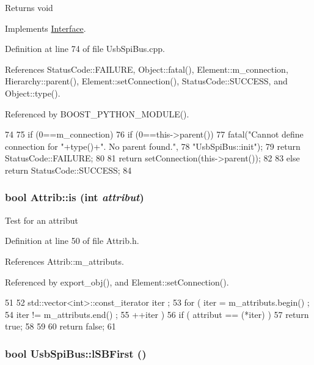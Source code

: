 \begin{DoxyReturn}{Returns}
void 
\end{DoxyReturn}


Implements \hyperlink{classInterface_a1d095c113b1e89d1f5f68323856fee63}{Interface}.

Definition at line 74 of file UsbSpiBus.cpp.

References StatusCode::FAILURE, Object::fatal(), Element::m\_\-connection, Hierarchy::parent(), Element::setConnection(), StatusCode::SUCCESS, and Object::type().

Referenced by BOOST\_\-PYTHON\_\-MODULE().


\begin{DoxyCode}
74                            {
75   if (0==m_connection){
76     if (0==this->parent()){
77       fatal("Cannot define connection for "+type()+". No parent found.",
78           "UsbSpiBus::init");
79         return StatusCode::FAILURE;
80     }
81     return setConnection(this->parent());
82   }
83   else return StatusCode::SUCCESS;
84 }
\end{DoxyCode}
\hypertarget{classAttrib_a704f26af560909ad22065083bb7d4c34}{
\subsubsection[{is}]{\setlength{\rightskip}{0pt plus 5cm}bool Attrib::is (int {\em attribut})}}
\label{classAttrib_a704f26af560909ad22065083bb7d4c34}
Test for an attribut 

Definition at line 50 of file Attrib.h.

References Attrib::m\_\-attributs.

Referenced by export\_\-obj(), and Element::setConnection().


\begin{DoxyCode}
51   {
52     std::vector<int>::const_iterator iter ;
53     for ( iter  = m_attributs.begin() ;
54           iter != m_attributs.end()   ;
55           ++iter ) {
56       if ( attribut == (*iter) ) {
57         return true;
58       }
59     }
60     return false;
61   }
\end{DoxyCode}
\hypertarget{classUsbSpiBus_af6af49c1ac52cc0586570c1f43d0bc25}{
\subsubsection[{lSBFirst}]{\setlength{\rightskip}{0pt plus 5cm}bool UsbSpiBus::lSBFirst ()}}
\label{classUsbSpiBus_af6af49c1ac52cc0586570c1f43d0bc25}


